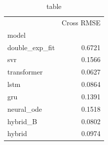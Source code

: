 \begin{table}
\caption{table}
\label{tab:table}
\begin{tabular}{lr}
\toprule
 & Cross RMSE \\
model &  \\
\midrule
double\_exp\_fit & 0.6721 \\
svr & 0.1566 \\
transformer & 0.0627 \\
lstm & 0.0864 \\
gru & 0.1391 \\
neural\_ode & 0.1518 \\
hybrid\_B & 0.0802 \\
hybrid & 0.0974 \\
\bottomrule
\end{tabular}
\end{table}

